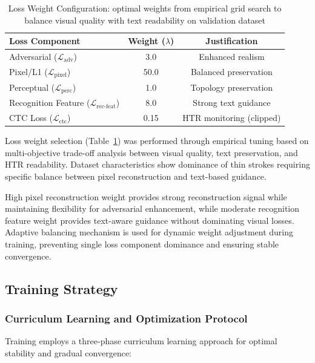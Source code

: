 \documentclass[journal]{IEEEtran}
\begin{document}
\begin{table}[!t]
\renewcommand{\arraystretch}{1.3}
\caption{Loss Weight Configuration: optimal weights from empirical grid search to balance visual quality with text readability on validation dataset}
\label{table_optimal_weights}
\centering
\begin{tabular}{|l|c|c|}
\hline
Loss Component & Weight ($\lambda$) & Justification \\
\hline
Adversarial ($\mathcal{L}_{\text{adv}}$) & 3.0 & Enhanced realism \\
Pixel/L1 ($\mathcal{L}_{\text{pixel}}$) & 50.0 & Balanced preservation \\
Perceptual ($\mathcal{L}_{\text{perc}}$) & 1.0 & Topology preservation \\
Recognition Feature ($\mathcal{L}_{\text{rec-feat}}$) & 8.0 & Strong text guidance \\
CTC Loss ($\mathcal{L}_{\text{ctc}}$) & 0.15 & HTR monitoring (clipped) \\
\hline
\end{tabular}
\end{table}

Loss weight selection (Table~\ref{table_optimal_weights}) was performed through empirical tuning based on multi-objective trade-off analysis between visual quality, text preservation, and HTR readability. Dataset characteristics show dominance of thin strokes requiring specific balance between pixel reconstruction and text-based guidance.

High pixel reconstruction weight provides strong reconstruction signal while maintaining flexibility for adversarial enhancement, while moderate recognition feature weight provides text-aware guidance without dominating visual losses. Adaptive balancing mechanism is used for dynamic weight adjustment during training, preventing single loss component dominance and ensuring stable convergence.

\subsection{Training Strategy}

\subsubsection{Curriculum Learning and Optimization Protocol}

Training employs a three-phase curriculum learning approach for optimal stability and gradual convergence:
\end{document}
